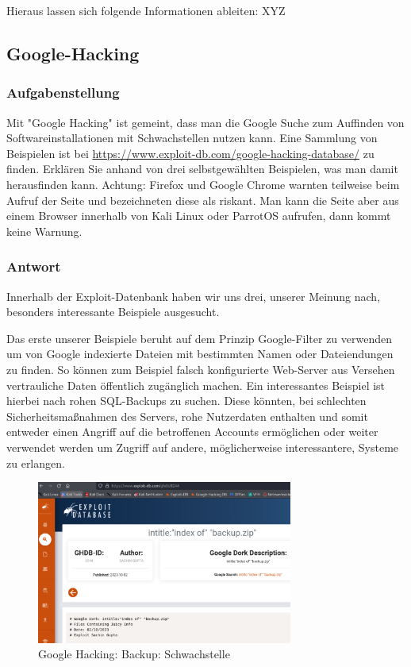 \documentclass{article}
\begin{document}
Hieraus lassen sich folgende Informationen ableiten: XYZ

\newpage

\subsection{Google-Hacking}

\subsubsection*{Aufgabenstellung}

Mit "Google Hacking" ist gemeint, dass man die Google Suche zum Auffinden von
Softwareinstallationen mit Schwachstellen nutzen kann. Eine Sammlung von Beispielen ist 
bei \url{https://www.exploit-db.com/google-hacking-database/} zu finden. Erklären Sie 
anhand von drei selbstgewählten Beispielen, was man damit herausfinden kann.
Achtung: Firefox und Google Chrome warnten teilweise beim Aufruf der Seite und bezeichneten diese als riskant. Man kann die Seite aber aus einem Browser innerhalb von Kali Linux oder ParrotOS aufrufen, dann kommt keine Warnung.

\subsubsection*{Antwort}

Innerhalb der Exploit-Datenbank haben wir uns drei, unserer Meinung nach, besonders 
interessante Beispiele ausgesucht.



Das erste unserer Beispiele beruht auf dem Prinzip Google-Filter zu verwenden um von 
Google indexierte Dateien mit bestimmten Namen oder Dateiendungen zu finden. So können zum 
Beispiel falsch konfigurierte Web-Server aus Versehen vertrauliche Daten öffentlich 
zugänglich machen. Ein interessantes Beispiel ist hierbei nach rohen SQL-Backups zu 
suchen. Diese könnten, bei schlechten Sicherheitsmaßnahmen des Servers, rohe Nutzerdaten 
enthalten und somit entweder einen Angriff auf die betroffenen Accounts ermöglichen oder 
weiter verwendet werden um Zugriff auf andere, möglicherweise interessantere, Systeme zu 
erlangen.


\begin{figure}[H]
	\includegraphics[width=0.75\textwidth]{images/15}
	\centering
	\caption{Google Hacking: Backup: Schwachstelle}
\end{figure}
\end{document}
